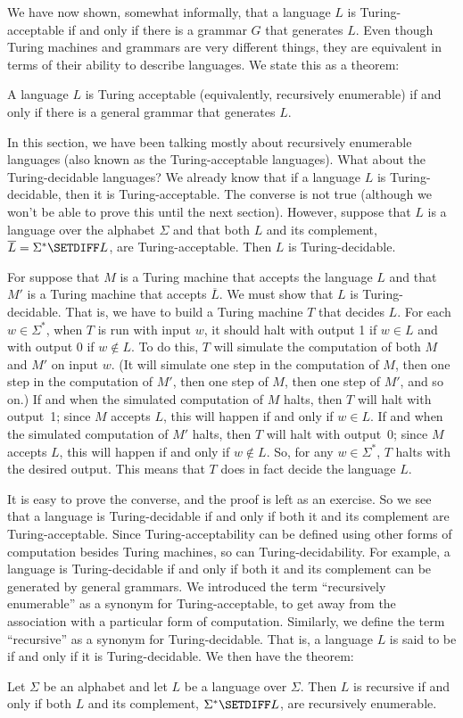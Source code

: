 We have now shown, somewhat informally, that a language
$L$ is Turing-acceptable if and only if there is a grammar $G$
that generates $L$.  Even though Turing machines and grammars
are very different things, they are equivalent in terms of
their ability to describe languages.  We state this as a theorem:
\begin{theorem}
A language $L$ is Turing acceptable (equivalently, recursively enumerable)
if and only if there is a general grammar that generates $L$.
\end{theorem}

\bigskip

In this section, we have been talking mostly about recursively enumerable
languages (also known as the Turing-acceptable languages).  What
about the Turing-decidable languages?  
We already know that if a language $L$ is Turing-decidable,
then it is Turing-acceptable.  The converse is not true (although
we won't be able to prove this until the next section).  However, suppose
that $L$ is a language over the alphabet $\Sigma$ and that both
$L$ and its complement,  $\overline{L}=\Sigma^*\SETDIFF L$, are Turing-acceptable.
Then $L$ is Turing-decidable.

For suppose that $M$ is a Turing machine that accepts the language
$L$ and that $M'$ is a Turing machine that accepts $\overline{L}$.
We must show that $L$ is Turing-decidable.  That is,
we have to build a Turing machine $T$ that decides $L$. For each
$w\in\Sigma^*$, when $T$ is run with input $w$, it should halt with
output 1 if $w\in L$ and with output $0$ if $w\not\in L$.  To do this,
$T$ will simulate the computation of both $M$ and $M'$ on input $w$.
(It will simulate one step in the computation of $M$, then one step
in the computation of $M'$, then one step of $M$, then one step of $M'$,
and so on.)  If and when the simulated computation of $M$ halts, then
$T$ will halt with output~1; since $M$ accepts $L$, this will happen if and
only if $w\in L$.  If and when the simulated computation of $M'$ halts, then
$T$ will halt with output~0; since $M$ accepts $L$, this will happen if and
only if $w\not\in L$.  So, for any $w\in\Sigma^*$, $T$ halts with the
desired output.  This means that $T$ does in fact decide the language $L$.

It is easy to prove the converse, and the proof is left as an exercise. So
we see that a language is Turing-decidable if and only if both it and
its complement are Turing-acceptable.  Since Turing-acceptability can
be defined using other forms of computation besides Turing machines,
so can Turing-decidability.  For example, a language is Turing-decidable
if and only if both it and its complement can be generated by general grammars.
We introduced the term ``recursively enumerable''
as a synonym for Turing-acceptable, to get away from the association with a
particular form of computation.  Similarly, we define the term ``recursive''
as a synonym for Turing-decidable.  That is, a language $L$
is said to be  if and only if it
is Turing-decidable.  We then have the theorem:

\begin{theorem}\label{T-re}
Let $\Sigma$ be an alphabet and let $L$ be a language over $\Sigma$.
Then $L$ is recursive if and only if both $L$ and its
complement, $\Sigma^*\SETDIFF L$, are recursively enumerable.
\end{theorem}

